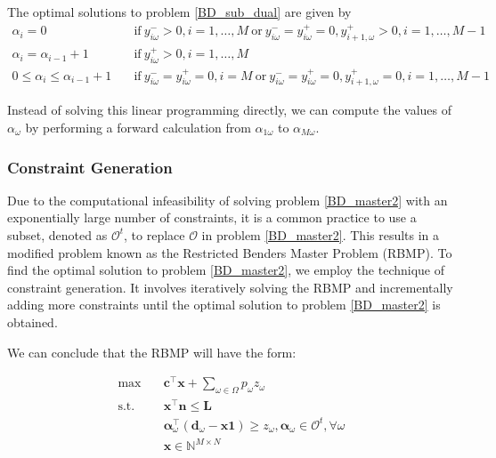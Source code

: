 \begin{prop}\label{optimal_sol_sub_dual}
  The optimal solutions to problem \eqref{BD_sub_dual} are given by 
\begin{equation}\label{BD_sub_simplified}
  \begin{aligned}
    \alpha_{i} = 0 \quad & \text{if}~  y_{i \omega}^{-} > 0,  i =1,\ldots, M~\text{or}~ y_{i \omega}^{-} = y_{i \omega}^{+} = 0, y_{i+1, \omega}^{+}> 0, i = 1,\ldots, M-1 \\
    \alpha_{i} = \alpha_{i-1}+1 \quad & \text{if}~ y_{i \omega}^{+} > 0, i =1,\ldots, M \\
    0 \leq \alpha_{i} \leq \alpha_{i-1}+1 \quad & \text{if}~ y_{i \omega}^{-} = y_{i \omega}^{+} = 0, i = M~\text{or}~ y_{i \omega}^{-} = y_{i \omega}^{+} = 0, y_{i+1, \omega}^{+}= 0, i = 1,\ldots, M-1
  \end{aligned}
\end{equation}
\end{prop}

Instead of solving this linear programming directly, we can compute the values of $\alpha_{\omega}$ by performing a forward calculation from $\alpha_{1\omega}$ to $\alpha_{M\omega}$.

\subsubsection{Constraint Generation}\label{bender_stage}
Due to the computational infeasibility of solving problem \eqref{BD_master2} with an exponentially large number of constraints, it is a common practice to use a subset, denoted as $\mathcal{O}^t$, to replace $\mathcal{O}$ in problem \eqref{BD_master2}. This results in a modified problem known as the Restricted Benders Master Problem (RBMP). To find the optimal solution to problem \eqref{BD_master2}, we employ the technique of constraint generation. It involves iteratively solving the RBMP and incrementally adding more constraints until the optimal solution to problem \eqref{BD_master2} is obtained.

We can conclude that the RBMP will have the form:

\begin{equation}\label{BD_master3}
  \begin{aligned}
    \max \quad & \mathbf{c}^{\intercal} \mathbf{x} + \sum_{\omega \in \Omega} p_{\omega} z_{\omega} \\
    \text {s.t.} \quad & \mathbf{x}^{\intercal} \mathbf{n}  \leq \mathbf{L} \\
    & \bm{\alpha}_{\omega}^{\intercal}(\mathbf{d}_{\omega}- \mathbf{x} \mathbf{1}) \geq z_{\omega}, \bm{\alpha}_{\omega} \in \mathcal{O}^{t}, \forall \omega \\
     & \mathbf{x} \in \mathbb{N}^{M \times N}
  \end{aligned}
\end{equation}


